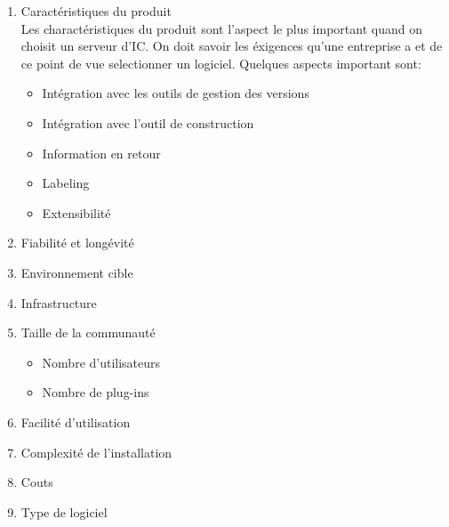 \begin{enumerate}
\item Caractéristiques du produit \\
Les charactéristiques du produit sont l'aspect le plus important quand on choisit un serveur d'IC. On doit savoir les éxigences qu'une entreprise a et de ce point de vue selectionner un logiciel. Quelques aspects important sont:
\begin{itemize}
\item Intégration avec les outils de gestion des versions
\item Intégration avec l'outil de construction
\item Information en retour
\item Labeling
\item Extensibilité
\end{itemize}
\item Fiabilité et longévité
\item Environnement cible
\item Infrastructure
\item Taille de la communauté
\begin{itemize}
\item Nombre d'utilisateurs
\item Nombre de plug-ins
\end{itemize}
\item Facilité d'utilisation
\item Complexité de l'installation
\item Couts
\item Type de logiciel
\end{enumerate}
\newpage
